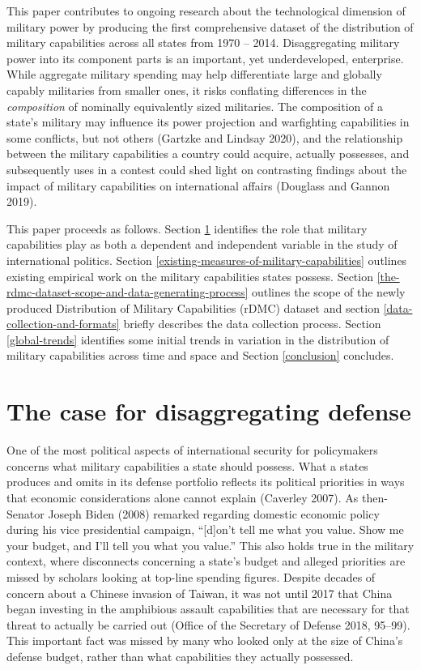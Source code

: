 \documentclass[
]{article}
\begin{document}
This paper contributes to ongoing research about the technological dimension of military power by producing the first comprehensive dataset of the distribution of military capabilities across all states from 1970 -- 2014. Disaggregating military power into its component parts is an important, yet underdeveloped, enterprise. While aggregate military spending may help differentiate large and globally capably militaries from smaller ones, it risks conflating differences in the \emph{composition} of nominally equivalently sized militaries. The composition of a state's military may influence its power projection and warfighting capabilities in some conflicts, but not others (Gartzke and Lindsay 2020), and the relationship between the military capabilities a country could acquire, actually possesses, and subsequently uses in a contest could shed light on contrasting findings about the impact of military capabilities on international affairs (Douglass and Gannon 2019).

This paper proceeds as follows. Section \ref{the-case-for-disaggregating-defense} identifies the role that military capabilities play as both a dependent and independent variable in the study of international politics. Section \ref{existing-measures-of-military-capabilities} outlines existing empirical work on the military capabilities states possess. Section \ref{the-rdmc-dataset-scope-and-data-generating-process} outlines the scope of the newly produced Distribution of Military Capabilities (rDMC) dataset and section \ref{data-collection-and-formats} briefly describes the data collection process. Section \ref{global-trends} identifies some initial trends in variation in the distribution of military capabilities across time and space and Section \ref{conclusion} concludes.

\hypertarget{the-case-for-disaggregating-defense}{%
\section{The case for disaggregating defense}\label{the-case-for-disaggregating-defense}}

One of the most political aspects of international security for policymakers concerns what military capabilities a state should possess. What a states produces and omits in its defense portfolio reflects its political priorities in ways that economic considerations alone cannot explain (Caverley 2007). As then-Senator Joseph Biden (2008) remarked regarding domestic economic policy during his vice presidential campaign, ``{[}d{]}on't tell me what you value. Show me your budget, and I'll tell you what you value.'' This also holds true in the military context, where disconnects concerning a state's budget and alleged priorities are missed by scholars looking at top-line spending figures. Despite decades of concern about a Chinese invasion of Taiwan, it was not until 2017 that China began investing in the amphibious assault capabilities that are necessary for that threat to actually be carried out (Office of the Secretary of Defense 2018, 95--99). This important fact was missed by many who looked only at the size of China's defense budget, rather than what capabilities they actually possessed.
\end{document}
